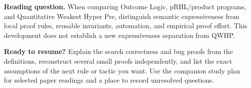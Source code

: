 \documentclass[11pt,a4paper]{article}
\begin{document}
\textbf{Reading question.} When comparing Outcome Logic, pRHL/product programs,
and Quantitative Weakest Hyper Pre, distinguish semantic expressiveness from
local proof rules, reusable invariants, automation, and empirical proof effort.
This development does not establish a new expressiveness separation from QWHP.

\textbf{Ready to resume?} Explain the search correctness and bug proofs from the
definitions, reconstruct several small proofs independently, and list the exact
assumptions of the next rule or tactic you want. Use the companion study plan
for selected paper readings and a place to record unresolved questions.
\end{document}
